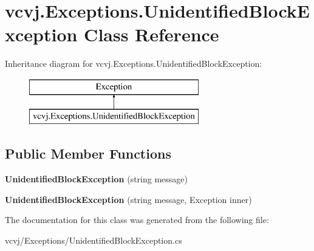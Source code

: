 \hypertarget{classvcvj_1_1_exceptions_1_1_unidentified_block_exception}{}\section{vcvj.\+Exceptions.\+Unidentified\+Block\+Exception Class Reference}
\label{classvcvj_1_1_exceptions_1_1_unidentified_block_exception}
Inheritance diagram for vcvj.\+Exceptions.\+Unidentified\+Block\+Exception\+:\begin{figure}[H]
\begin{center}
\leavevmode
\includegraphics[height=2.000000cm]{classvcvj_1_1_exceptions_1_1_unidentified_block_exception}
\end{center}
\end{figure}
\subsection*{Public Member Functions}
\begin{DoxyCompactItemize}
\item 
{\bfseries Unidentified\+Block\+Exception} (string message)\hypertarget{classvcvj_1_1_exceptions_1_1_unidentified_block_exception_a8c33f3e8a5d61834e04229dd77a552c3}{}\label{classvcvj_1_1_exceptions_1_1_unidentified_block_exception_a8c33f3e8a5d61834e04229dd77a552c3}

\item 
{\bfseries Unidentified\+Block\+Exception} (string message, Exception inner)\hypertarget{classvcvj_1_1_exceptions_1_1_unidentified_block_exception_aff570dbd1eb13e62f9db98f1eaf4c041}{}\label{classvcvj_1_1_exceptions_1_1_unidentified_block_exception_aff570dbd1eb13e62f9db98f1eaf4c041}

\end{DoxyCompactItemize}


The documentation for this class was generated from the following file\+:\begin{DoxyCompactItemize}
\item 
vcvj/\+Exceptions/Unidentified\+Block\+Exception.\+cs\end{DoxyCompactItemize}
